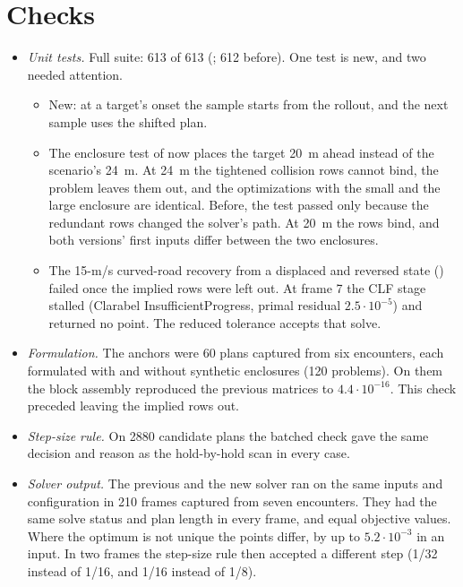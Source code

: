 \documentclass[11pt]{article}
\begin{document}
\section{Checks}
\begin{itemize}
\item \emph{Unit tests.} Full suite: 613 of 613 (; 612
  before). One
  test is new, and two needed attention.
  \begin{itemize}
  \item New: at a target's onset the sample starts from the rollout, and
    the next sample uses the shifted plan.
  \item The enclosure test of  now
    places the target 20~m ahead instead of the scenario's 24~m. At 24~m
    the tightened collision rows cannot bind, the problem leaves them out,
    and the optimizations with the small and the large enclosure are
    identical. Before, the test passed only because the redundant rows
    changed the solver's path. At 20~m the rows bind, and both versions'
    first inputs differ between the two enclosures.
  \item The 15-m/s curved-road recovery from a displaced and reversed state
    () failed once the implied rows were left
    out. At frame 7 the CLF stage stalled (Clarabel InsufficientProgress,
    primal residual $2.5\cdot10^{-5}$) and returned no point. The reduced
    tolerance accepts that solve.
  \end{itemize}
\item \emph{Formulation.} The anchors were 60 plans captured from six
  encounters, each formulated with and without synthetic enclosures (120
  problems). On them the block assembly reproduced the previous matrices to
  $4.4\cdot10^{-16}$. This check preceded leaving the implied rows out.
\item \emph{Step-size rule.} On 2880 candidate plans the batched check gave
  the same decision and reason as the hold-by-hold scan in every case.
\item \emph{Solver output.} The previous and the new solver ran on the same
  inputs and configuration in 210 frames captured from seven encounters.
  They had the same solve status and plan length in every frame, and equal
  objective values. Where the optimum is not unique the points differ, by up
  to $5.2\cdot10^{-3}$ in an input. In two frames the step-size rule then
  accepted a different step (1/32 instead of 1/16, and 1/16 instead of 1/8).
\end{itemize}
\end{document}

